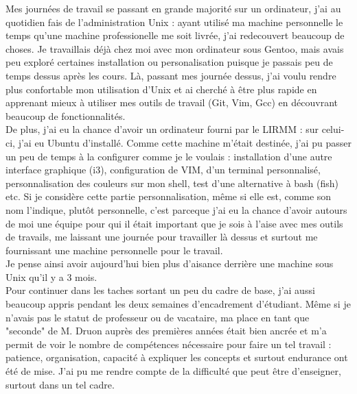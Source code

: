 \documentclass[11pt,french,a4paper]{report}
\begin{document}
Mes journées de travail se passant en grande majorité sur un ordinateur, j'ai au quotidien fais de l'administration Unix : ayant utilisé ma machine
personnelle le temps qu'une machine professionelle me soit livrée, j'ai redecouvert beaucoup de choses. Je travaillais déjà chez moi avec mon ordinateur
sous Gentoo, mais avais peu exploré certaines installation ou personalisation puisque je passais peu de temps dessus après les cours. Là, passant
mes journée dessus, j'ai voulu rendre plus confortable mon utilisation d'Unix et ai cherché à être plus rapide en apprenant mieux à utiliser mes outils de travail
(Git, Vim, Gcc) en découvrant beaucoup de fonctionnalités. \\
De plus, j'ai eu la chance d'avoir un ordinateur fourni par le LIRMM : sur celui-ci, j'ai eu Ubuntu d'installé. Comme cette machine m'était destinée, 
j'ai pu passer un peu de temps à la configurer comme je le voulais : installation d'une autre interface graphique (i3), configuration de VIM, 
d'un terminal personnalisé, personnalisation des couleurs sur mon shell, test d'une alternative à bash (fish) etc.  Si je considère cette 
partie personnalisation, même si elle est, comme son nom l'indique, plutôt personnelle, c'est parceque j'ai eu la chance d'avoir autours de moi
une équipe pour qui il était important que je sois à l'aise avec mes outils de travails, me laissant une journée pour travailler là dessus et 
surtout me fournissant une machine personnelle pour le travail. \\ 
Je pense ainsi avoir aujourd'hui bien plus d'aisance derrière une machine sous Unix qu'il y a 3 mois. \\

Pour continuer dans les taches sortant un peu du cadre de base, j'ai aussi beaucoup appris pendant les deux semaines d'encadrement d'étudiant. Même
si je n'avais pas le statut de professeur ou de vacataire, ma place en tant que "seconde" de M. Druon auprès des premières années était bien ancrée 
et m'a permit de voir le nombre de compétences nécessaire pour faire un tel travail : patience, organisation, capacité à expliquer les concepts et surtout 
endurance ont été de mise. J'ai pu me rendre compte de la difficulté que peut être d'enseigner, surtout dans un tel cadre. \\
\end{document}
